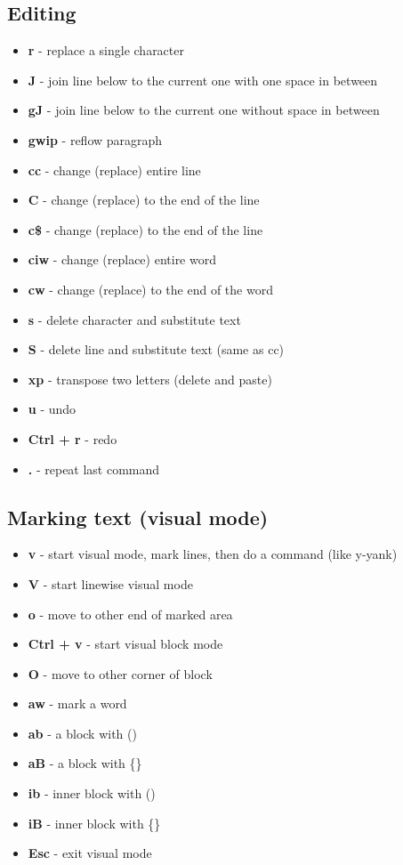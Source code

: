 \documentclass[landscape,twocolumn]{article}
\providecommand{\tightlist}{%
  \setlength{\itemsep}{0pt}\setlength{\parskip}{0pt}}
\begin{document}
\hypertarget{editing}{%
\subsection{Editing}\label{editing}}

\begin{itemize}
\tightlist
\item
  \textbf{r} - replace a single character
\item
  \textbf{J} - join line below to the current one with one space in
  between
\item
  \textbf{gJ} - join line below to the current one without space in
  between
\item
  \textbf{gwip} - reflow paragraph
\item
  \textbf{cc} - change (replace) entire line
\item
  \textbf{C} - change (replace) to the end of the line
\item
  \textbf{c\$} - change (replace) to the end of the line
\item
  \textbf{ciw} - change (replace) entire word
\item
  \textbf{cw} - change (replace) to the end of the word
\item
  \textbf{s} - delete character and substitute text
\item
  \textbf{S} - delete line and substitute text (same as cc)
\item
  \textbf{xp} - transpose two letters (delete and paste)
\item
  \textbf{u} - undo
\item
  \textbf{Ctrl + r} - redo
\item
  \textbf{.} - repeat last command
\end{itemize}

\hypertarget{marking-text-visual-mode}{%
\subsection{Marking text (visual mode)}\label{marking-text-visual-mode}}

\begin{itemize}
\tightlist
\item
  \textbf{v} - start visual mode, mark lines, then do a command (like
  y-yank)
\item
  \textbf{V} - start linewise visual mode
\item
  \textbf{o} - move to other end of marked area
\item
  \textbf{Ctrl + v} - start visual block mode
\item
  \textbf{O} - move to other corner of block
\item
  \textbf{aw} - mark a word
\item
  \textbf{ab} - a block with ()
\item
  \textbf{aB} - a block with \{\}
\item
  \textbf{ib} - inner block with ()
\item
  \textbf{iB} - inner block with \{\}
\item
  \textbf{Esc} - exit visual mode
\end{itemize}
\end{document}
